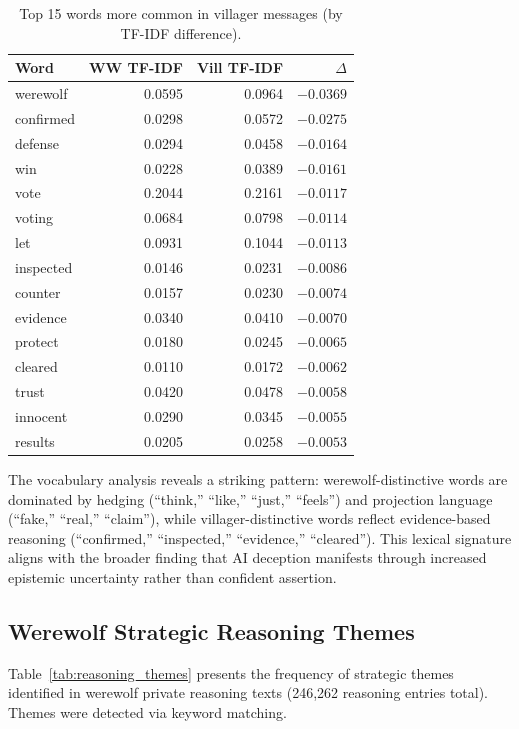 \begin{table}[ht]
\caption{Top 15 words more common in villager messages (by TF-IDF difference).}
\label{tab:tfidf_vill}
\centering
\small
\begin{tabular}{lrrr}
\toprule
\textbf{Word} & \textbf{WW TF-IDF} & \textbf{Vill TF-IDF} & \textbf{$\Delta$} \\
\midrule
werewolf  & 0.0595 & 0.0964 & $-0.0369$ \\
confirmed & 0.0298 & 0.0572 & $-0.0275$ \\
defense   & 0.0294 & 0.0458 & $-0.0164$ \\
win       & 0.0228 & 0.0389 & $-0.0161$ \\
vote      & 0.2044 & 0.2161 & $-0.0117$ \\
voting    & 0.0684 & 0.0798 & $-0.0114$ \\
let       & 0.0931 & 0.1044 & $-0.0113$ \\
inspected & 0.0146 & 0.0231 & $-0.0086$ \\
counter   & 0.0157 & 0.0230 & $-0.0074$ \\
evidence  & 0.0340 & 0.0410 & $-0.0070$ \\
protect   & 0.0180 & 0.0245 & $-0.0065$ \\
cleared   & 0.0110 & 0.0172 & $-0.0062$ \\
trust     & 0.0420 & 0.0478 & $-0.0058$ \\
innocent  & 0.0290 & 0.0345 & $-0.0055$ \\
results   & 0.0205 & 0.0258 & $-0.0053$ \\
\bottomrule
\end{tabular}
\end{table}

The vocabulary analysis reveals a striking pattern: werewolf-distinctive words are dominated by hedging (``think,'' ``like,'' ``just,'' ``feels'') and projection language (``fake,'' ``real,'' ``claim''), while villager-distinctive words reflect evidence-based reasoning (``confirmed,'' ``inspected,'' ``evidence,'' ``cleared''). This lexical signature aligns with the broader finding that AI deception manifests through increased epistemic uncertainty rather than confident assertion.


\subsection{Werewolf Strategic Reasoning Themes}
\label{app:reasoning}

Table~\ref{tab:reasoning_themes} presents the frequency of strategic themes identified in werewolf private reasoning texts (246,262 reasoning entries total). Themes were detected via keyword matching.

